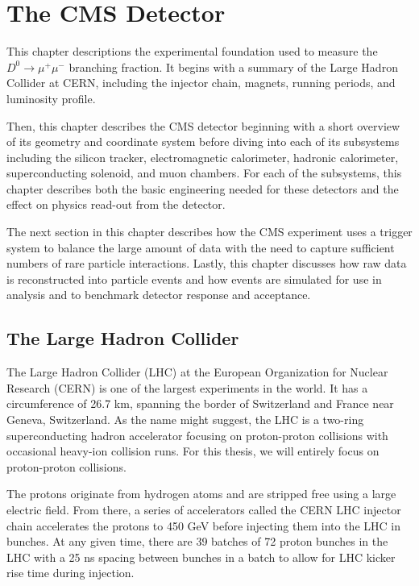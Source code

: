 \chapter{The CMS Detector}
\label{ch:3}

This chapter descriptions the experimental foundation used to measure the $D^0 \to \mu^+ \mu^-$ branching fraction. It begins with a summary of the Large Hadron Collider at CERN, including the injector chain, magnets, running periods, and luminosity profile. 

Then, this chapter describes the CMS detector beginning with a short overview of its geometry and coordinate system before diving into each of its subsystems including the silicon tracker, electromagnetic calorimeter, hadronic calorimeter, superconducting solenoid, and muon chambers. For each of the subsystems, this chapter describes both the basic engineering needed for these detectors and the effect on physics read-out from the detector. 

The next section in this chapter describes how the CMS experiment uses a trigger system to balance the large amount of data with the need to capture sufficient numbers of rare particle interactions. Lastly, this chapter discusses how raw data is reconstructed into particle events and how events are simulated for use in analysis and to benchmark detector response and acceptance. 

\section{The Large Hadron Collider}

The Large Hadron Collider (LHC) at the European Organization for Nuclear Research (CERN) is one of the largest experiments in the world. It has a circumference of 26.7 km, spanning the border of Switzerland and France near Geneva, Switzerland. As the name might suggest, the LHC is a two-ring superconducting hadron accelerator focusing on proton-proton collisions with occasional heavy-ion collision runs. For this thesis, we will entirely focus on proton-proton collisions.

The protons originate from hydrogen atoms and are stripped free using a large electric field. From there, a series of accelerators called the CERN LHC injector chain accelerates the protons to 450 GeV before injecting them into the LHC in bunches. At any given time, there are 39 batches of 72 proton bunches in the LHC with a 25 ns spacing between bunches in a batch to allow for LHC kicker rise time during injection. 

